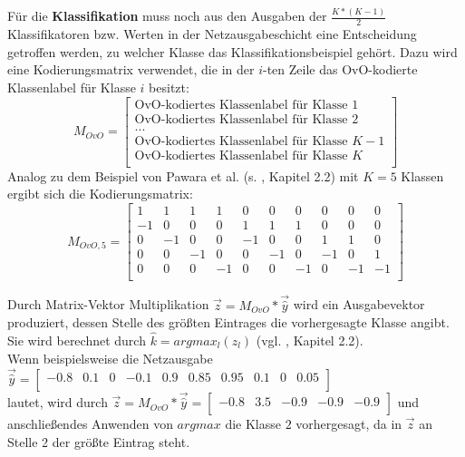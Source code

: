 Für die \textbf{Klassifikation} muss noch aus den Ausgaben der $\frac{K*(K-1)}{2}$ Klassifikatoren bzw. Werten in der Netzausgabeschicht eine Entscheidung getroffen werden, zu welcher Klasse das Klassifikationsbeispiel gehört.
Dazu wird eine Kodierungsmatrix verwendet, die in der $i$-ten Zeile das OvO-kodierte Klassenlabel für Klasse $i$ besitzt:\\
\[M_{OvO}=
\begin{bmatrix}
\text{OvO-kodiertes Klassenlabel für Klasse } 1 \\ 
\text{OvO-kodiertes Klassenlabel für Klasse } 2 \\ 
... \\
\text{OvO-kodiertes Klassenlabel für Klasse } K-1 \\ 
\text{OvO-kodiertes Klassenlabel für Klasse } K \\ 
\end{bmatrix} 
\]
Analog zu dem Beispiel von Pawara et al. (s. \cite{pawaraPaper}, Kapitel 2.2) mit $K=5$ Klassen ergibt sich die Kodierungsmatrix:
\[M_{OvO,5}=
\begin{bmatrix}
1 & 1 & 1 & 1 & 0 & 0 & 0 & 0 & 0 & 0\\
-1 & 0 & 0 & 0 & 1 & 1 & 1 & 0 & 0 & 0\\
0 & -1 & 0 & 0 & -1 & 0 & 0 & 1 & 1 & 0\\
0 & 0 & -1 & 0 & 0 & -1 & 0 & -1 & 0 & 1\\
0 & 0 & 0 & -1 & 0 & 0 & -1 & 0 & -1 & -1\\
\end{bmatrix} 
\]

Durch Matrix-Vektor Multiplikation $\overrightarrow{z} = M_{OvO} * \overrightarrow{\widehat{y}}$ wird ein Ausgabevektor produziert, dessen Stelle des größten Eintrages die vorhergesagte Klasse angibt.\\
Sie wird berechnet durch $\widehat{k} = argmax_l (z_l)$ (vgl. \cite{pawaraPaper}, Kapitel 2.2).\\


Wenn beispielsweise die Netzausgabe \\
 $\overrightarrow{\widehat{y}} = \begin{bmatrix}
-0.8 & 0.1 & 0 & -0.1 & 0.9 & 0.85 & 0.95 & 0.1 & 0 & 0.05\\
\end{bmatrix}
$ \\
lautet, wird durch $\overrightarrow{z} = M_{OvO} * \overrightarrow{\widehat{y}} = \begin{bmatrix}
-0.8 & 3.5 & -0.9 & -0.9 & -0.9\\
\end{bmatrix}$ und anschließendes Anwenden von $argmax$ die Klasse $2$ vorhergesagt, da in $\overrightarrow{z}$ an Stelle 2 der größte Eintrag steht.

